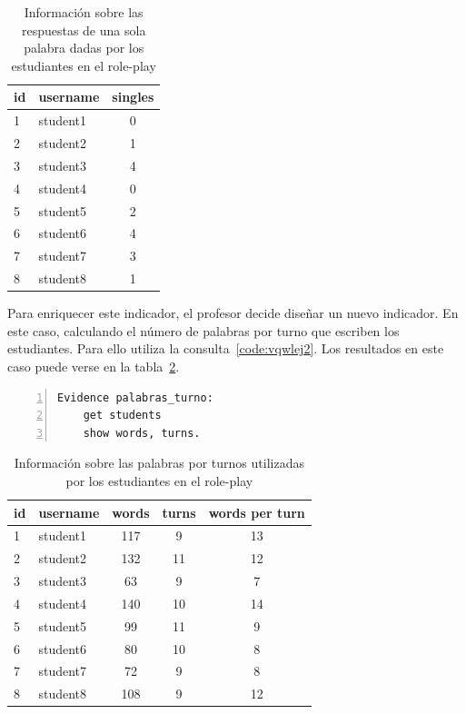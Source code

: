 \begin{table}
	\centering
	\caption{Información sobre las respuestas de una sola palabra dadas por los estudiantes en el role-play}
	\label{tab:EvsListEj1}
	\begin{tabular}{|l|l|c|}
		\hline
		id & username & singles \\
		\hline
		\hline
		1 & student1 & 0  \\
		\hline
		2 & student2 & 1  \\
		\hline
		3 & student3 & 4  \\
		\hline
		4 & student4 & 0  \\
		\hline
		5 & student5 & 2  \\
		\hline
		6 & student6 & 4  \\
		\hline
		7 & student7 & 3  \\
		\hline
		8 & student8 & 1  \\
		\hline
	\end{tabular}
\end{table}

Para enriquecer este indicador, el profesor decide diseñar un nuevo indicador. En este caso, calculando el número de palabras por turno que escriben los estudiantes. Para ello utiliza la consulta~\ref{code:vqwlej2}. Los resultados en este caso puede verse en la tabla~\ref{tab:EvsListEj2}.

\begin{lstlisting}[caption=Respuesas de una sola palabra, label=code:vqwlej2,numbers=left, captionpos=b, morekeywords={Evidence,get, students, single, show, words, sentences, turns, time, points}]
Evidence palabras_turno:
    get students
    show words, turns.
\end{lstlisting}

\begin{table}
	\centering
	\caption{Información sobre las palabras por turnos utilizadas por los estudiantes en el role-play}
	\label{tab:EvsListEj2}
	\begin{tabular}{|l|l|c|c|c|}
		\hline
		id & username & words & turns & words per turn \\
		\hline
		\hline
		1 & student1 & 117 & 9 & 13 \\
		\hline
		2 & student2 & 132 & 11 & 12  \\
		\hline
		3 & student3 & 63 & 9 & 7  \\
		\hline
		4 & student4 & 140 & 10 & 14  \\
		\hline
		5 & student5 & 99  & 11 & 9 \\
		\hline
		6 & student6 & 80 & 10 & 8  \\
		\hline
		7 & student7 & 72 & 9 & 8  \\
		\hline
		8 & student8 & 108 & 9 & 12   \\
		\hline
	\end{tabular}
\end{table}

